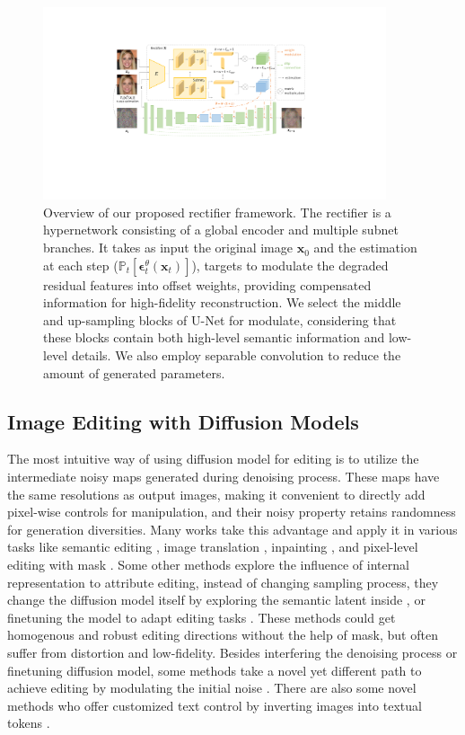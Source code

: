 \documentclass[letterpaper]{article} %
\begin{document}
\begin{figure}[t]
    \centering
    \includegraphics[width=0.9\textwidth]{Figs/fig2.pdf}
    \caption{Overview of our proposed rectifier framework. The rectifier is a hypernetwork consisting of a global encoder and multiple subnet branches. 
    It takes as input the original image $\bm{x}_0$ and the estimation at each step ($\mathbb{P}_t[\bm{\epsilon}_t^\theta(\bm{x}_t)]$), targets to modulate the degraded residual features into offset weights, providing compensated information for high-fidelity reconstruction. 
    We select the middle and up-sampling blocks of U-Net for modulate, considering that these blocks contain both high-level semantic information and low-level details. 
    We also employ separable convolution to reduce the amount of generated parameters.}
    \label{fig2}
\end{figure}

\subsection{Image Editing with Diffusion Models}
The most intuitive way of using diffusion model for editing is to utilize the intermediate noisy maps generated during denoising process. These maps have the same resolutions as output images, making it convenient to directly add pixel-wise controls for manipulation, and their noisy property retains randomness for generation diversities. Many works take this advantage and apply it in various tasks like semantic editing \cite{choi2021ilvr}, image translation \cite{meng2021sdedit}, inpainting \cite{lugmayr2022repaint}, and pixel-level editing with mask \cite{nichol2021glide,yang2023paint,avrahami2022blended}. Some other methods explore the influence of internal representation to attribute editing, instead of changing sampling process, they change the diffusion model itself by exploring the semantic latent inside \cite{kwon2022diffusion}, or finetuning the model to adapt editing tasks \cite{kim2022diffusionclip, hertz2022prompt, kawar2023imagic}. These methods could get homogenous and robust editing directions without the help of mask, but often suffer from distortion and low-fidelity. Besides interfering the denoising process or finetuning diffusion model, some methods take a novel yet different path to achieve editing by modulating the initial noise \cite{mao2023guided}. There are also some novel methods who offer customized text control by inverting images into textual tokens \cite{gal2022image, mokady2023null}. 
\end{document}
